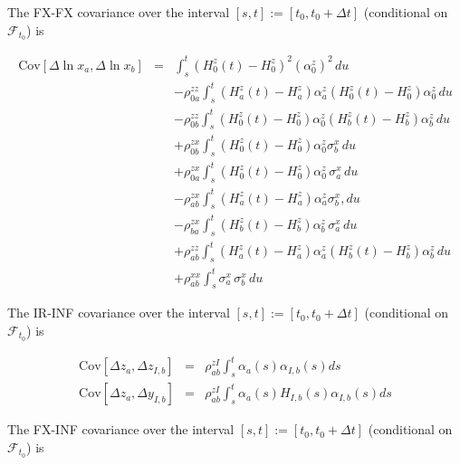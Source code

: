 \documentclass[12pt, a4paper]{article}
\begin{document}
{{\begin{appendix}
The FX-FX covariance over the interval $[s,t] := [t_0, t_0+\Delta t]$ (conditional on $\mathcal{F}_{t_0}$) is

\begin{eqnarray*}
      \mathrm{Cov}[\Delta \ln x_a, \Delta \ln x_b] &=&
      \int_s^t \left(H^z_0(t)-H^z_0\right)^2 (\alpha_0^z)^2\,du \nonumber\\
      && -\rho^{zz}_{0a} \int_s^t \left(H^z_a(t)-H^z_a\right) \alpha_a^z\left(H^z_0(t)-H^z_0\right) \alpha_0^z\,du
  \nonumber\\
      &&- \rho^{zz}_{0b}\int_s^t \left(H^z_0(t)-H^z_0\right)\alpha_0^z \left(H^z_b(t)-H^z_b\right)\alpha_b^z\,du
  \nonumber\\
      &&+ \rho^{zx}_{0b}\int_s^t \left(H^z_0(t)-H^z_0\right)\alpha_0^z \sigma^x_b\,du \nonumber\\
      &&+ \rho^{zx}_{0a}\int_s^t \left(H^z_0(t)-H^z_0\right)\alpha_0^z\,\sigma^x_a\,du \nonumber\\
      &&- \rho^{zx}_{ab}\int_s^t \left(H^z_a(t)-H^z_a\right)\alpha_a^z \sigma^x_b,du\nonumber\\
      &&- \rho^{zx}_{ba}\int_s^t \left(H^z_b(t)-H^z_b\right)\alpha_b^z\,\sigma^x_a\, du \nonumber\\
      &&+ \rho^{zz}_{ab}\int_s^t \left(H^z_a(t)-H^z_a\right)\alpha_a^z \left(H^z_b(t)-H^z_b\right)\alpha_b^z\,du
  \nonumber\\
      &&+ \rho^{xx}_{ab}\int_s^t\sigma^x_a\,\sigma^x_b \,du
\end{eqnarray*}

The IR-INF covariance over the interval $[s,t] := [t_0, t_0+\Delta t]$ (conditional on $\mathcal{F}_{t_0}$) is

\begin{eqnarray*}
  \mathrm{Cov}[ \Delta z_a, \Delta z_{I,b} ] & = & \rho_{ab}^{zI} \int_s^t \alpha_a(s) \alpha_{I,b}(s) ds \\
  \mathrm{Cov}[ \Delta z_a, \Delta y_{I,b} ] & = & \rho_{ab}^{zI} \int_s^t \alpha_a(s) H_{I,b}(s) \alpha_{I,b}(s) ds
\end{eqnarray*}

The FX-INF covariance over the interval $[s,t] := [t_0, t_0+\Delta t]$ (conditional on $\mathcal{F}_{t_0}$) is


\end{appendix}}}
\end{document}

